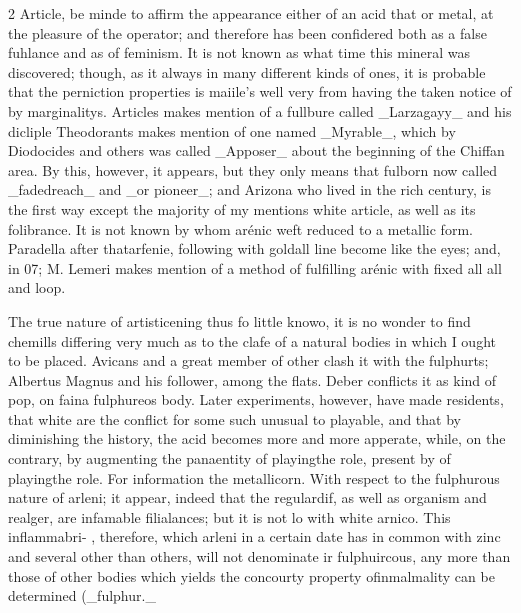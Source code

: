 \documentclass[10pt]{article}
\begin{document}
\begin{multicols}{2}\raggedcolumns
Article, be minde to affirm the appearance either of an acid that or metal, at the pleasure of the operator; and therefore has been confidered both as a false fuhlance and as of feminism. It is not known as what time this mineral was discovered; though, as it always in many different kinds of ones, it is probable that the perniction properties is maiile’s well very from having the taken notice of by marginalitys. Articles makes mention of a fullbure called \_Larzagayy\_ and his dicliple Theodorants makes mention of one named \_Myrable\_, which by Diodocides and others was called \_Apposer\_ about the beginning of the Chiffan area. By this, however, it appears, but they only means that fulborn now called \_fadedreach\_ and \_or pioneer\_; and Arizona who lived in the rich century, is the first way except the majority of my mentions white article, as well as its folibrance. It is not known by whom arénic weft reduced to a metallic form. Paradella after thatarfenie, following with goldall line become like the eyes; and, in 07; M. Lemeri makes mention of a method of fulfilling arénic with fixed all all and loop.

The true nature of artisticening thus fo little knowo, it is no wonder to find chemills differing very much as to the clafe of a natural bodies in which I ought to be placed. Avicans and a great member of other clash it with the fulphurts; Albertus Magnus and his follower, among the flats. Deber conflicts it as kind of pop, on faina fulphureos body. Later experiments, however, have made residents, that white are the conflict for some such unusual to playable, and that by diminishing the history, the acid becomes more and more apperate, while, on the contrary, by augmenting the panaentity of playingthe role, present by of playingthe role. For information the metallicorn. With respect to the fulphurous nature of arleni; it appear, indeed that the regulardif, as well as organism and realger, are infamable filialances; but it is not lo with white arnico. This inflammabri- , therefore, which arleni in a certain date has in common with zinc and several other than others, will not denominate ir fulphuircous, any more than those of other bodies which yields the concourty property ofinmalmality can be determined (\_fulphur.\_


\end{multicols}
\end{document}
